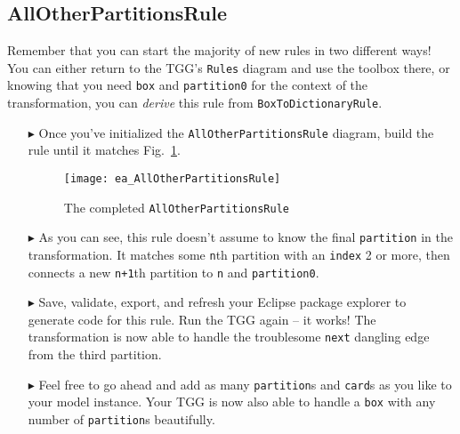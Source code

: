 \newpage
\hypertarget{allCards vis}{}
\subsection{AllOtherPartitionsRule}
\genHeader

Remember that you can start the majority of new rules in two different ways! You can either return to the TGG's \texttt{Rules} diagram and use the toolbox
there, or knowing that you need \texttt{box} and \texttt{partition0} for the context of the transformation, you can \emph{derive} this rule from 
\texttt{BoxToDictionaryRule}.

\begin{itemize}

\item[$\blacktriangleright$] Once you've initialized the \texttt{AllOtherPartitionsRule} diagram, build the rule until it matches
Fig.~\ref{fig:ea_AllOtherPartitionsRuleComplete}.

\begin{figure}[htbp]
\begin{center}
  \texttt{[image: ea\_AllOtherPartitionsRule]}
  \caption{The completed \texttt{AllOtherPartitionsRule}}
  \label{fig:ea_AllOtherPartitionsRuleComplete}
\end{center}
\end{figure}

\item[$\blacktriangleright$] As you can see, this rule doesn't assume to know the final \texttt{partition} in the transformation. It matches some
\texttt{n}th partition with an \texttt{index} 2 or more, then connects a new \texttt{n+1}th partition to \texttt{n} and \texttt{partition0}. 

\item[$\blacktriangleright$] Save, validate, export, and refresh your Eclipse package explorer to generate code for this rule. Run the TGG again -- it works!
The transformation is now able to handle the troublesome \texttt{next} dangling edge from the third partition.

\item[$\blacktriangleright$] Feel free to go ahead and add as many \texttt{partition}s and \texttt{card}s as you like to your model instance.
Your TGG is now
also able to handle a \texttt{box} with any number of \texttt{partition}s beautifully. 

\end{itemize}
